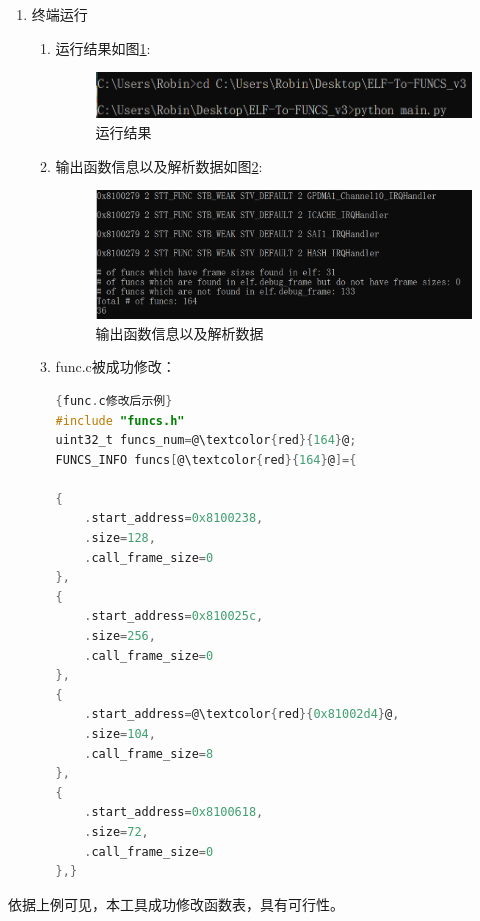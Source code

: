 \documentclass[UTF8,12pt,a4paper,twoside]{ctexart}
\numberwithin{figure}{section}
\begin{document}
\begin{enumerate}
\begin{enumerate}
          \end{enumerate}
    \item 终端运行
          \begin{enumerate}
              \item 运行结果如图\ref{yx}:
                    \begin{figure}[H]
                        \centering
                        \includegraphics[scale=0.5]{graph/zhongduanjieguo.png}
                        \caption{运行结果}
                        \label{yx}
                    \end{figure}
              \item 输出函数信息以及解析数据如图\ref{sc}:
                    \begin{figure}[H]
                        \centering
                        \includegraphics[scale=0.3]{graph/shuchujieguo.png}
                        \caption{输出函数信息以及解析数据}
                        \label{sc}
                    \end{figure}
              \item func.c被成功修改：
                    \begin{lstlisting}[language=C]{func.c修改后示例}
#include "funcs.h"
uint32_t funcs_num=@\textcolor{red}{164}@;
FUNCS_INFO funcs[@\textcolor{red}{164}@]={
    
{
    .start_address=0x8100238,
    .size=128,
    .call_frame_size=0
},
{
    .start_address=0x810025c,
    .size=256,
    .call_frame_size=0
},
{
    .start_address=@\textcolor{red}{0x81002d4}@,
    .size=104,
    .call_frame_size=8
},
{
    .start_address=0x8100618,
    .size=72,
    .call_frame_size=0
},}\end{lstlisting}
     \end{enumerate}
\end{enumerate}
\par 依据上例可见，本工具成功修改函数表，具有可行性。
\end{document}
